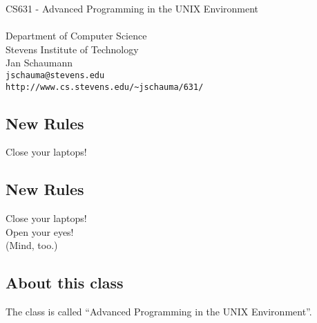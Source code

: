 \documentclass[sxga]{xdvislides}
\begin{document}
\setfontphv

\lhead{\slidetitle}
\cfoot{\relax}
\rfoot{\Gray{\today}}

\vspace*{\fill}
\begin{center}
	\Hugesize
		CS631 - Advanced Programming in the UNIX Environment\\ [1em]
	\hspace*{5mm}\blueline\\ [1em]
	\Normalsize
		Department of Computer Science\\
		Stevens Institute of Technology\\
		Jan Schaumann\\
		\verb+jschauma@stevens.edu+\\
		\verb+http://www.cs.stevens.edu/~jschauma/631/+
\end{center}
\vspace*{\fill}

\subsection{New Rules}
\Hugesize
\vspace*{\fill}
\begin{center}
Close your laptops!
\end{center}
\vspace*{\fill}
\Normalsize

\subsection{New Rules}
\Hugesize
\vspace*{\fill}
\begin{center}
Close your laptops! \\
\vspace{.5in}
Open your eyes! \\
\small
(Mind, too.)
\end{center}
\vspace*{\fill}
\Normalsize

\subsection{About this class}
The class is called ``Advanced Programming in the UNIX
Environment''.\\
\end{document}
